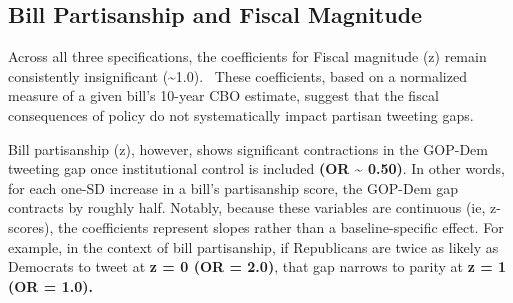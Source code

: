 \documentclass[
]{article}
\begin{document}
\subsection{\texorpdfstring{\textbf{Bill Partisanship and Fiscal
Magnitude}}{Bill Partisanship and Fiscal Magnitude}}\label{bill-partisanship-and-fiscal-magnitude}

Across all three specifications, the coefficients for Fiscal magnitude
(z) remain consistently insignificant (\textasciitilde1.0).~ These
coefficients, based on a normalized measure of a given bill's 10-year
CBO estimate, suggest that the fiscal consequences of policy do not
systematically impact partisan tweeting gaps.

Bill partisanship (z), however, shows significant contractions in the
GOP-Dem tweeting gap once institutional control is included \textbf{(OR
\textasciitilde{} 0.50)}. In other words, for each one-SD increase in a
bill's partisanship score, the GOP-Dem gap contracts by roughly half.
Notably, because these variables are continuous (ie, z-scores), the
coefficients represent slopes rather than a baseline-specific effect.
For example, in the context of bill partisanship, if Republicans are
twice as likely as Democrats to tweet at \textbf{z = 0 (OR = 2.0)}, that
gap narrows to parity at \textbf{z = 1 (OR = 1.0).}

\FloatBarrier
\end{document}
